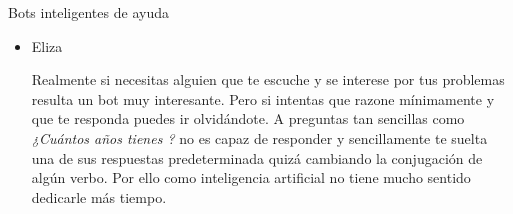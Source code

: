 \documentclass[spanish, a4paper, 12pt]{article} 	%
\begin{document}
\begin{section}{Bots inteligentes de ayuda}
\begin{itemize}
\begin{itemize}
			
		\end{itemize}
		\item{Eliza}
		
	Realmente si necesitas alguien que te escuche y se interese por tus problemas resulta un bot muy interesante. Pero si intentas que razone mínimamente y que te responda puedes ir olvidándote. A preguntas tan sencillas como  \textit{¿Cuántos años tienes ?} no es capaz de responder y sencillamente te suelta una de sus respuestas predeterminada quizá cambiando la conjugación de algún verbo. Por ello como inteligencia artificial no tiene mucho sentido dedicarle más tiempo.
	
	\end{itemize}
\end{section}
\end{document}
